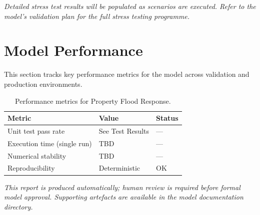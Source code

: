 \documentclass[11pt,a4paper]{article}
\begin{document}
\textit{Detailed stress test results will be populated as scenarios are executed.
Refer to the model's validation plan for the full stress testing programme.}

\section{Model Performance}

This section tracks key performance metrics for the model across
validation and production environments.

\begin{table}[H]
    \centering
    \caption{Performance metrics for Property Flood Response.}
    \begin{tabular}{lll}
        \toprule
        \textbf{Metric} & \textbf{Value} & \textbf{Status} \\
        \midrule
        Unit test pass rate & See Test Results & --- \\
        Execution time (single run) & TBD & --- \\
        Numerical stability & TBD & --- \\
        Reproducibility & Deterministic & OK \\
        \bottomrule
    \end{tabular}
\end{table}

\vspace{12pt}

\noindent\textit{\small This report is produced automatically; human review
is required before formal model approval. Supporting artefacts are available
in the model documentation directory.}
\end{document}
